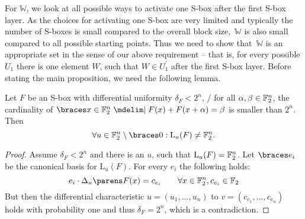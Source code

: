 For $\mathbb{W}$, we look at all possible ways to activate one S-box after the first S-box layer.
As the choices for activating one S-box are very limited and typically the number of S-boxes is small compared to the overall block size,~$\mathbb{W}$ is also small compared to all possible starting points.
Thus we need to show that~$\mathbb{W}$ is an appropriate set in the sense of our above requirement -- that is, for every possible $U_1$ there is one element $W$, such that $W \in U_1^\prime$ after the first S-box layer.
Before stating the main proposition, we need the following lemma.
\begin{lemma}\label{st:lem:ls_dim}
    Let $F$ be an S-box with differential uniformity $\delta_F < 2^n$, \ie/ for all $\alpha, \beta \in \mathbb{F}_2^n$, the cardinality of $\set{x \in \F_2^n \given F(x) + F(x + \alpha) = \beta}$ is smaller than $2^n$.
    Then
    \begin{equation*}
        \forall u \in \F_2^n \setminus \set{0} : \mathrm{L}_u(F) \ne \F_2^n.
    \end{equation*}
\end{lemma}
\begin{proof}
    Assume $\delta_F < 2^n$ and there is an $u$, such that $\mathrm{L}_u(F) = \mathbb{F}_2^n$.
    Let $\set{e_i}$ be the canonical basis for $\mathrm{L}_u(F)$.
    For every $e_i$ the following holds:
    \begin{equation*}
        \iprod{e_i}{\derive{u}{F}(x)} = c_{e_i} \qquad \forall x \in \F_2^n, c_{e_i} \in \F_2
    \end{equation*}
    But then the differential characteristic $u = (u_1, \ldots, u_n)$ to $v = (c_{e_1}, \ldots, c_{e_n})$ holds with probability one and thus $\delta_F = 2^n$, which is a contradiction.
\end{proof}

